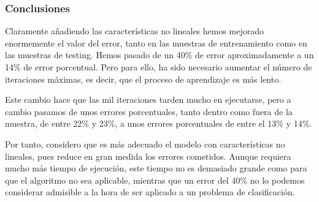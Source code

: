 \documentclass[11pt]{article}
\begin{document}
\subsubsection{Conclusiones}

Claramente añadiendo las características no lineales hemos mejorado enormemente el valor del error, tanto en las muestras de entrenamiento como en las muestras de testing. Hemos pasado de un 40\% de error aproximadamente a un 14\% de error porcentual. Pero para ello, ha sido necesario aumentar el número de iteraciones máximas, es decir, que el proceso de aprendizaje es más lento.

Este cambio hace que las mil iteraciones tarden mucho en ejecutarse, pero a cambio pasamos de unos errores porcentuales, tanto dentro como fuera de la muestra, de entre 22\% y 23\%, a unos errores porcentuales de entre el 13\%  y 14\%.

Por tanto, considero que es más adecuado el modelo con características no lineales, pues reduce en gran medida los errores cometidos. Aunque requiera mucho más tiempo de ejecución, este tiempo no es demasiado grande como para que el algoritmo no sea aplicable, mientras que un error del 40\% no lo podemos considerar admisible a la hora de ser aplicado a un problema de clasificación.
\end{document}
